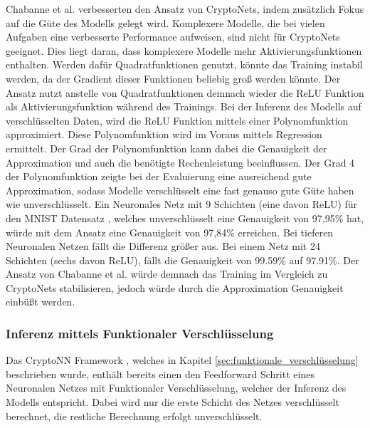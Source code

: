Chabanne et al. \cite{P-55} verbesserten den Ansatz von CryptoNets, indem zusätzlich Fokus auf die Güte des Modells gelegt wird. 
Komplexere Modelle, die bei vielen Aufgaben eine verbesserte Performance aufweisen, sind nicht für CryptoNets geeignet.
Dies liegt daran, dass komplexere Modelle mehr Aktivierungsfunktionen enthalten. 
Werden dafür Quadratfunktionen genutzt, könnte das Training instabil werden, da der Gradient dieser Funktionen beliebig groß werden könnte.
Der Ansatz nutzt anstelle von Quadratfunktionen demnach wieder die ReLU Funktion als Aktivierungsfunktion während des Trainings.
Bei der Inferenz des Modells auf verschlüsselten Daten, wird die ReLU Funktion mittels einer Polynomfunktion approximiert.
Diese Polynomfunktion wird im Voraus mittels Regression ermittelt. 
Der Grad der Polynomfunktion kann dabei die Genauigkeit der Approximation und auch die benötigte Rechenleistung beeinflussen.
Der Grad 4 der Polynomfunktion zeigte bei der Evaluierung eine ausreichend gute Approximation, sodass Modelle verschlüsselt eine fast genauso gute Güte haben wie unverschlüsselt.
Ein Neuronales Netz mit 9 Schichten (eine davon ReLU) für den MNIST Datensatz \cite{D-MNIST}, welches unverschlüsselt eine Genauigkeit von 97,95\% hat, würde mit dem Ansatz eine Genauigkeit von 97,84\% erreichen.
Bei tieferen Neuronalen Netzen fällt die Differenz größer aus. 
Bei einem Netz mit 24 Schichten (sechs davon ReLU), fällt die Genauigkeit von 99.59\% auf 97.91\%.
Der Ansatz von Chabanne et al. \cite{P-55} würde demnach das Training im Vergleich zu CryptoNets \cite{P-54} stabilisieren, jedoch würde durch die Approximation Genauigkeit einbüßt werden.


\subsubsection*{Inferenz mittels Funktionaler Verschlüsselung}
Das CryptoNN Framework \cite{P-53}, welches in Kapitel \ref{sec:funktionale_verschlüsselung} beschrieben wurde, enthält bereits einen den Feedforward Schritt eines Neuronalen Netzes mit Funktionaler Verschlüsselung, welcher der Inferenz des Modells entspricht.
Dabei wird nur die erste Schicht des Netzes verschlüsselt berechnet, die restliche Berechnung erfolgt unverschlüsselt.

